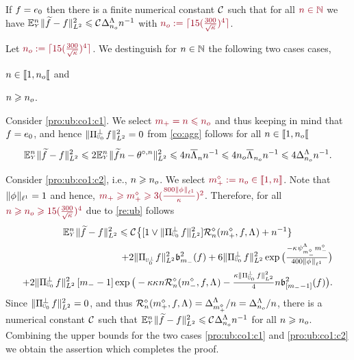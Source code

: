 \begin{lm}\label{re:ub:co1} If $\xdf=\bas_0$ then  there is a finite numerical
  constant $\cst{}$ such that for all $\dr\ssY\in\Nz$ we have
  $\FuEx[\ssY]{\rY}\VnormLp{\txdfPr[]-\xdf}^2\leq\cst{}\DipenSv[\ssY_o]\ssY^{-1}$ with  
$\dr\ssY_o:=\ceil{15(\tfrac{300}{\sqrt{\cpen}})^4}$.
\end{lm}
\begin{pro}
Let $\dr\ssY_o:=\ceil{15(\tfrac{300}{\sqrt{\cpen}})^4}$. We destinguish for $\ssY\in\Nz$ the following two cases
cases, \begin{inparaenum}[i]\renewcommand{\theenumi}{\dgrau\rm(\alph{enumi})}\item\label{pro:ub:co1:c1}
$\ssY\in\nsetro{1,\ssY_o}$ and \item\label{pro:ub:co1:c2}
$\ssY\geq\ssY_o$.\end{inparaenum}

Consider \ref{pro:ub:co1:c1}. We select 
$\dr\pDi=\ssY\leq\ssY_o$ and thus keeping in mind that $\xdf=\bas_0$,
and hence $\VnormLp{\Proj[{\mHiH[0]}]^\perp\xdf}^2=0$  from
\cref{co:agg} follows for all $\ssY\in\nsetro{1,\ssY_o}$
\begin{equation}\label{pro:ub:co1:e1}
\FuEx[\ssY]{\rY}\VnormLp{\txdf-\xdf}^2\leq2\FuEx[\ssY]{\rY}\VnormLp{\txdfPr[\ssY]-\xdfPr[\ssY]}^2\leq4\ssY\oiSv[\ssY]\ssY^{-1}\leq
4 \ssY_o\oiSv[\ssY_o]\ssY^{-1}\leq4\DipenSv[\ssY_o]\ssY^{-1}.
\end{equation}

Consider \ref{pro:ub:co1:c2}, i.e., $\ssY\geq\ssY_o$. We select
$\dr\pdDi:=\ssY_o\in\nset{1,\ssY}$. 
Note that $\Vnormlp[1]{\fydf}=1$ and hence, $\dr\pDi\geq\pdDi\geq
3(\tfrac{800\Vnormlp[1]{\fydf}}{\cpen})^2$. Therefore, for all  $\dr
\ssY\geq \ssY_o\geq 15(\tfrac{300}{\sqrt{\cpen}})^4$ due to \cref{re:ub} 
 follows
\begin{multline*}
\FuEx[\ssY]{\rY}\VnormLp{\txdf-\xdf}^2\leq\cst{}\big\{
[1\vee\VnormLp{\Proj[{\mHiH[0]}]^\perp\xdf}^2]\hRa{\pdDi,\xdf,\iSv}+\ssY^{-1}\}\\\hfill
+2\VnormLp{\Proj[{\mHiH[0]^\perp}]\xdf}^2\bias[\mDi]^2(\xdf)
+6\VnormLp{\Proj[{\mHiH[0]}]^\perp\xdf}^2 \exp\big(\tfrac{-\cpen\cmSv[\mdDi]\mdDi}{400\Vnormlp[1]{\fydf}}\big)
\\\hfill
\hfill+2\VnormLp{\Proj[{\mHiH[0]}]^\perp\xdf}^2\,[\mDi-1]\exp\big(-\rWc\cpen\ssY\hRa{\mdDi,\xdf,\iSv}-
    \tfrac{\rWc\VnormLp{\Proj[{\mHiH[0]}]^\perp\xdf}^2}{4}\ssY\bias[{[\mDi-1]}]^2(\xdf)\big).
\end{multline*}
Since
$\VnormLp{\Proj[{\mHiH[0]}]^\perp\xdf}^2=0$, and thus
$\hRa{\pdDi,\xdf,\iSv}=\DipenSv[\pdDi]/\ssY=\DipenSv[\ssY_o]/\ssY$,
there is a numerical constant $\cst{}$ such that
$\FuEx[\ssY]{\rY}\VnormLp{\txdf-\xdf}^2\leq\cst{}\DipenSv[\ssY_o]\ssY^{-1}$
for all $\ssY\geq\ssY_o$. Combining
the upper bounds  for the two
cases \ref{pro:ub:co1:c1} and \ref{pro:ub:co1:c2}  we obtain the
assertion which  completes the proof.
\end{pro}
